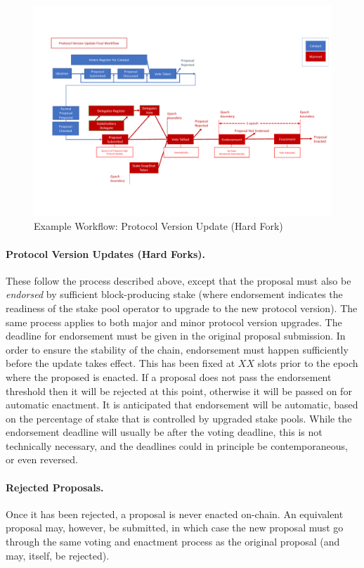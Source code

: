 \begin{figure}
  \includegraphics[trim=0 90 0 80,clip,width=\textwidth]{Workflow2}
  \caption{Example Workflow: Protocol Version Update (Hard Fork)}
  \label{fig:workflow-hf}
\end{figure}

\paragraph{Protocol Version Updates (Hard Forks).}  These follow the process described above,
except that the proposal must also be \emph{endorsed} by sufficient block-producing stake
(where endorsement indicates the readiness of the stake pool operator to upgrade to the new protocol version).
The same process applies to both major and minor protocol version upgrades.
The deadline for endorsement must be given in the original proposal submission.
In order to ensure the stability of the chain, endorsement must happen sufficiently before the update takes
effect.  This has been fixed at $XX$ slots prior to the epoch where the proposed is enacted.
If a proposal does not pass the endorsement threshold then it will be rejected at this point, otherwise it will be
passed on for automatic enactment.  It is anticipated that endorsement will be automatic, based on the percentage of stake that
is controlled by upgraded stake pools.
While the endorsement deadline will usually be after the voting deadline, this is not technically necessary, and the deadlines could
in principle be contemporaneous, or even reversed.

\paragraph{Rejected Proposals.}   Once it has been rejected, a proposal is never enacted on-chain.
An equivalent proposal may, however, be submitted, in which case the new proposal must go through the same voting and enactment process
as the original proposal (and may, itself, be rejected).
